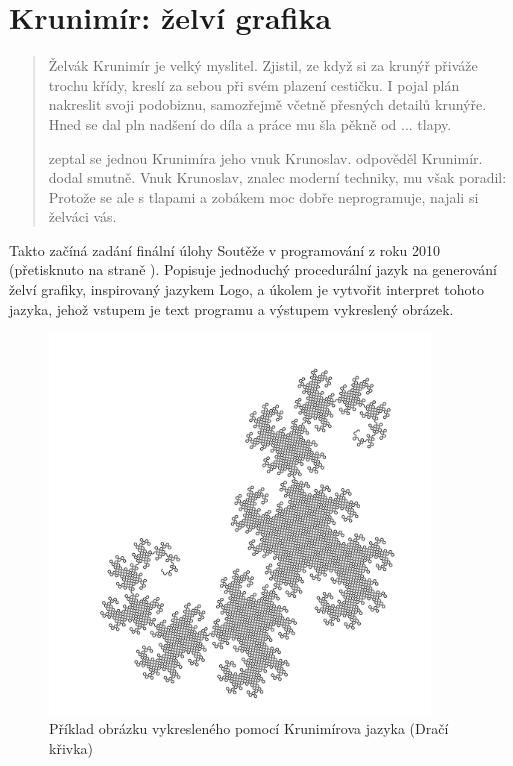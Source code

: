 \chapter{Krunimír: želví grafika}
\label{chap:krunimir}

\begin{quotation}
Želvák Krunimír je velký myslitel. Zjistil, ze když si za krunýř přiváže trochu
křídy, kreslí za sebou při svém plazení cestičku. I pojal plán nakreslit svoji
podobiznu, samozřejmě včetně přesných detailů krunýře. Hned se dal pln nadšení
do díla a práce mu šla pěkně od ... tlapy.

 zeptal se jednou Krunimíra jeho vnuk Krunoslav.
 odpověděl Krunimír.  dodal smutně.   Vnuk Krunoslav, znalec moderní techniky, mu
však poradil: 
Protože se ale s tlapami a zobákem moc dobře neprogramuje, najali si želváci
vás.
\end{quotation}

Takto začíná zadání finální úlohy Soutěže v programování z roku
2010 \cite{krunimir-task} (přetisknuto na straně \pageref{pdf:krunimir}).
Popisuje jednoduchý procedurální jazyk na generování želví grafiky, inspirovaný
jazykem Logo, a úkolem je vytvořit interpret tohoto jazyka, jehož vstupem je
text programu a výstupem vykreslený obrázek. 

\begin{figure}
  \includegraphics[width=0.9\textwidth]{krunimir/examples/dragon}

  \caption{Příklad obrázku vykresleného pomocí Krunimírova jazyka (Dračí
  křivka)}
  \label{fig:krunimir-dragon}
\end{figure}

